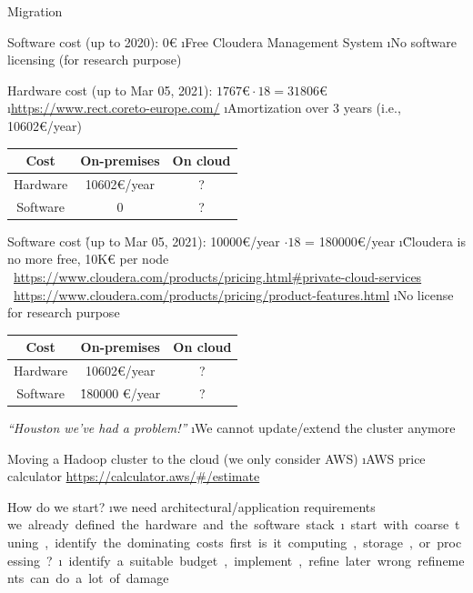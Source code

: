 \begin{frame}{Migration}
\framebreak

Software cost (up to 2020): 0\euro{}
\i Free Cloudera Management System
\i No software licensing (for research purpose)

Hardware cost (up to Mar 05, 2021): $1767\euro{} \cdot 18 = 31806\euro{}$
\i \url{https://www.rect.coreto-europe.com/}
\i Amortization over 3 years (i.e., 10602\euro{}/year)

\begin{table}[h!]
    \centering
    \footnotesize
    \begin{tabular}{ccc}
        Cost     &  On-premises  & On cloud  \\\hline
        Hardware & 10602\euro{}/year & ?         \\
        Software & 0             & ?         \\
    \end{tabular}
\end{table}

\framebreak

Software cost \r{(up to Mar 05, 2021): 10000\euro{}/year $\cdot 18$ = 180000\euro{}/year}
\i \r{Cloudera is no more free, 10K\euro{} per node}
\si {\footnotesize \url{https://www.cloudera.com/products/pricing.html#private-cloud-services}}
\si {\footnotesize \url{https://www.cloudera.com/products/pricing/product-features.html}}
\i No license for research purpose

\begin{table}[h!]
    \centering
    \footnotesize
    \begin{tabular}{ccc}
        Cost     &  On-premises            & On cloud  \\\hline
        Hardware &  10602\euro{}/year      & ?         \\
        Software & \r{180000 \euro{}/year} & ?         \\
    \end{tabular}
\end{table}

\textit{``Houston we've had a problem!''}
\i We cannot update/extend the cluster anymore

\framebreak

Moving a Hadoop cluster to the cloud (we only consider AWS)
\i AWS price calculator \url{https://calculator.aws/#/estimate}

How do we start?
\i we need architectural/application requirements
\si we already defined the hardware and the software stack
\i start with coarse tuning, identify the dominating costs first
\si is it computing, storage, or processing?
\i identify a suitable budget, implement, refine later
\si wrong refinements can do a lot of damage


\end{frame}
